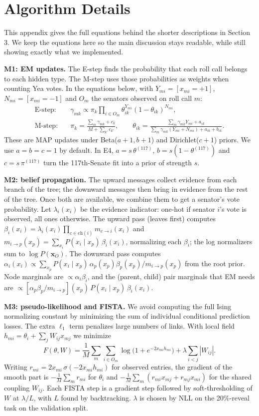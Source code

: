 \documentclass[10pt]{article}
\begin{document}
\appendix
\section{Algorithm Details}\label{app:alg}
This appendix gives the full equations behind the shorter descriptions in Section 3. We keep the equations here so the main discussion stays readable, while still showing exactly what we implemented.

\textbf{M1: EM updates.} The E-step finds the probability that each roll call belongs to each hidden type. The M-step uses those probabilities as weights when counting Yea votes. In the equations below,
with $Y_{mi}=[x_{mi}{=}{+}1]$, $N_{mi}=[x_{mi}{=}{-}1]$ and $O_m$ the senators observed on
roll call $m$:
\begin{align*}
\text{E-step:}\quad &\gamma_{mk}\propto\pi_k\prod_{i\in O_m}\theta_{ik}^{Y_{mi}}(1-\theta_{ik})^{N_{mi}},\\
\text{M-step:}\quad &\pi_k=\frac{\sum_m\gamma_{mk}+c_k}{M+\sum_{k'}c_{k'}},\qquad
\theta_{ik}=\frac{\sum_m\gamma_{mk}Y_{mi}+a_{ik}}{\sum_m\gamma_{mk}(Y_{mi}+N_{mi})+a_{ik}+b_{ik}}.
\end{align*}
These are MAP updates under Beta($a{+}1,b{+}1$) and Dirichlet($c{+}1$) priors. We use $a=b=c=1$ by default. In E4,
$a=s\,\theta^{(117)}$, $b=s(1-\theta^{(117)})$ and $c=s\,\pi^{(117)}$ turn the 117th-Senate fit into a prior of
strength $s$.

\textbf{M2: belief propagation.} The upward messages collect evidence from each branch of the tree; the downward messages then bring in evidence from the rest of the tree. Once both are available, we combine them to get a senator's vote probability. Let $\lambda_i(x_i)$ be the evidence indicator: one-hot if senator $i$'s vote is
observed, all ones otherwise. The upward pass (leaves first) computes
$\beta_i(x_i)=\lambda_i(x_i)\prod_{c\in\mathrm{ch}(i)}m_{c\to i}(x_i)$ and
$m_{i\to p}(x_p)=\sum_{x_i}P(x_i\mid x_p)\,\beta_i(x_i)$, normalizing each $\beta_i$; the log normalizers sum to
$\log P(\mathbf x_O)$. The downward pass computes
$\alpha_i(x_i)\propto\sum_{x_p}P(x_i\mid x_p)\,\alpha_p(x_p)\beta_p(x_p)/m_{i\to p}(x_p)$ from the root prior. Node
marginals are $\propto\alpha_i\beta_i$, and the (parent, child) pair marginals that EM needs are
$\propto[\alpha_p\beta_p/m_{i\to p}](x_p)\,P(x_i\mid x_p)\,\beta_i(x_i)$.

\textbf{M3: pseudo-likelihood and FISTA.} We avoid computing the full Ising normalizing constant by minimizing the sum of individual conditional prediction losses. The extra $\ell_1$ term penalizes large numbers of links. With local field $h_{mi}=\theta_i+\sum_jW_{ij}x_{mj}$ we minimize
\[
F(\theta,W)=\frac1M\sum_m\sum_{i\in O_m}\log\big(1+e^{-2x_{mi}h_{mi}}\big)+\lambda\sum_{i<j}|W_{ij}|.
\]
Writing $r_{mi}=2x_{mi}\,\sigma(-2x_{mi}h_{mi})$ for observed entries, the gradient of the smooth part is
$-\frac1M\sum_m r_{mi}$ for $\theta_i$ and $-\frac1M\sum_m(r_{mi}x_{mj}+r_{mj}x_{mi})$ for the shared coupling
$W_{ij}$. Each FISTA step is a gradient step followed by soft-thresholding of $W$ at $\lambda/L$, with $L$ found by
backtracking. $\lambda$ is chosen by NLL on the 20\%-reveal task on the validation split.
\end{document}
